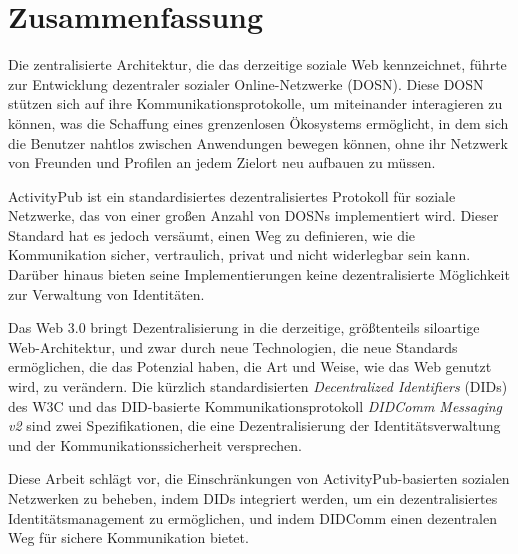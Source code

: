 \chapter*{Zusammenfassung}
\label{cha:zusammenfassung}

Die zentralisierte Architektur, die das derzeitige soziale Web kennzeichnet, führte zur Entwicklung dezentraler sozialer Online-Netzwerke (DOSN). Diese DOSN stützen sich auf ihre Kommunikationsprotokolle, um miteinander interagieren zu können, was die Schaffung eines grenzenlosen Ökosystems ermöglicht, in dem sich die Benutzer nahtlos zwischen Anwendungen bewegen können, ohne ihr Netzwerk von Freunden und Profilen an jedem Zielort neu aufbauen zu müssen.

ActivityPub ist ein standardisiertes dezentralisiertes Protokoll für soziale Netzwerke, das von einer großen Anzahl von DOSNs implementiert wird. Dieser Standard hat es jedoch versäumt, einen Weg zu definieren, wie die Kommunikation sicher, vertraulich, privat und nicht widerlegbar sein kann. Darüber hinaus bieten seine Implementierungen keine dezentralisierte Möglichkeit zur Verwaltung von Identitäten.

Das Web 3.0 bringt Dezentralisierung in die derzeitige, größtenteils siloartige Web-Architektur, und zwar durch neue Technologien, die neue Standards ermöglichen, die das Potenzial haben, die Art und Weise, wie das Web genutzt wird, zu verändern. Die kürzlich standardisierten \emph{Decentralized Identifiers} (DIDs) des W3C und das DID-basierte Kommunikationsprotokoll \emph{DIDComm Messaging v2} sind zwei Spezifikationen, die eine Dezentralisierung der Identitätsverwaltung und der Kommunikationssicherheit versprechen.  

Diese Arbeit schlägt vor, die Einschränkungen von ActivityPub-basierten sozialen Netzwerken zu beheben, indem DIDs integriert werden, um ein dezentralisiertes Identitätsmanagement zu ermöglichen, und indem DIDComm einen dezentralen Weg für sichere Kommunikation bietet.